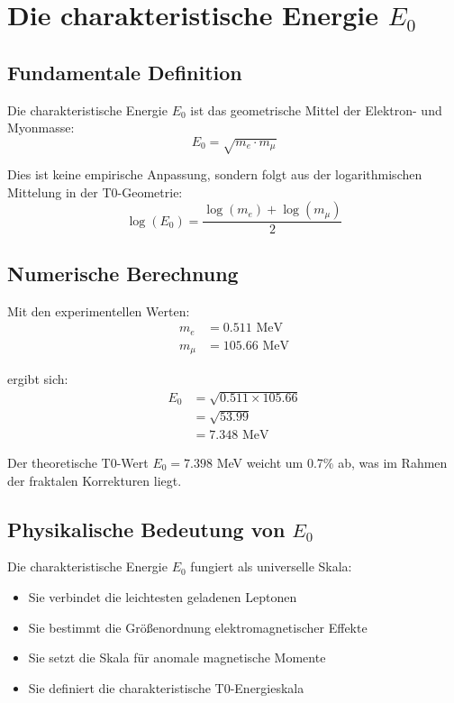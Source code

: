\documentclass[12pt,a4paper]{article}
\newcommand{\Ezero}{E_0}
\begin{document}
	\section{Die charakteristische Energie $\Ezero$}
	
	\subsection{Fundamentale Definition}
	
	Die charakteristische Energie $\Ezero$ ist das geometrische Mittel der Elektron- und Myonmasse:
	\begin{equation}
		\boxed{\Ezero = \sqrt{m_e \cdot m_\mu}}
		\label{eq:E0_fundamental}
	\end{equation}
	
	Dies ist keine empirische Anpassung, sondern folgt aus der logarithmischen Mittelung in der T0-Geometrie:
	\begin{equation}
		\log(\Ezero) = \frac{\log(m_e) + \log(m_\mu)}{2}
		\label{eq:E0_logarithmic}
	\end{equation}
	
	\subsection{Numerische Berechnung}
	
	Mit den experimentellen Werten:
	\begin{align}
		m_e &= 0.511 \text{ MeV}\\
		m_\mu &= 105.66 \text{ MeV}
	\end{align}
	
	ergibt sich:
	\begin{align}
		\Ezero &= \sqrt{0.511 \times 105.66}\\
		&= \sqrt{53.99}\\
		&= 7.348 \text{ MeV}
	\end{align}
	
	Der theoretische T0-Wert $\Ezero = 7.398$ MeV weicht um 0.7\% ab, was im Rahmen der fraktalen Korrekturen liegt.
	
	\subsection{Physikalische Bedeutung von $\Ezero$}
	
	Die charakteristische Energie $\Ezero$ fungiert als universelle Skala:
	\begin{itemize}
		\item Sie verbindet die leichtesten geladenen Leptonen
		\item Sie bestimmt die Größenordnung elektromagnetischer Effekte
		\item Sie setzt die Skala für anomale magnetische Momente
		\item Sie definiert die charakteristische T0-Energieskala
	\end{itemize}
	
\end{document}
